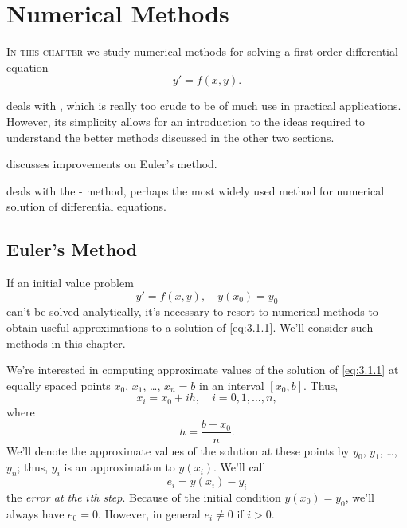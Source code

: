 
\chapter{Numerical Methods}\label{ch:numerical}

\textsc{In this chapter} we study numerical methods for solving a first order
differential equation
\[
y'=f(x,y).
\]


\medskip\noindent
{} deals with
, which is
really too crude to be of much use in practical applications. However,
its simplicity allows for an introduction to the ideas required to
understand the better methods discussed in the other two sections.

\medskip\noindent
{} discusses improvements on Euler's method.


\medskip\noindent
{} deals with the
-
method, perhaps the most widely used method
for numerical solution of differential equations.


\newpage

\section{Euler's Method}\label{sec:euler_method}

If an initial value problem
\begin{equation} \label{eq:3.1.1}
y'=f(x,y),\quad y(x_0)=y_0
 \end{equation}
can't be solved analytically,
 it's necessary to resort to
numerical methods to obtain useful  approximations to a solution of
\eqref{eq:3.1.1}. We'll consider such methods in this chapter.

We're interested in
computing approximate values of the solution of \eqref{eq:3.1.1} at
equally spaced points $x_0$, $x_1$, \dots, $x_n=b$ in an interval
$[x_0,b]$.
 Thus,
\[
x_i=x_0+ih,\quad i=0,1, \dots,n,
\]
where
\[
h=\frac{b-x_0}{n}.
\]
We'll denote the approximate values of the solution at these points
by $y_0$, $y_1$, \dots, $y_n$;   thus, $y_i$ is an approximation to
$y(x_i)$.
We'll call
\[
e_i=y(x_i)-y_i
\]
the
\emph{\color{blue}error at the $i$th step}.
Because of the initial condition $y(x_0)=y_0$, we'll always have $e_0=0$.
However, in general $e_i\ne0$ if $i>0$.

